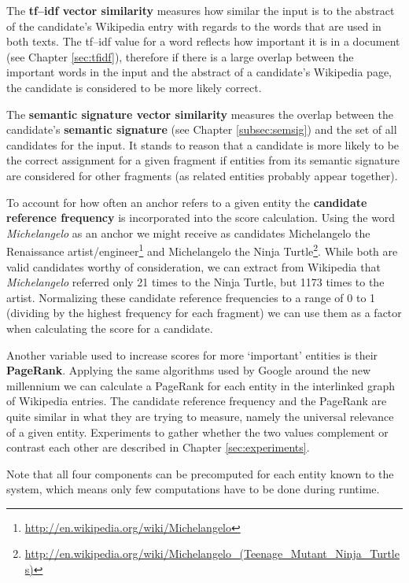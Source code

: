 \documentclass[runningheads,a4paper]{llncs}
\begin{document}
The \textbf{tf--idf vector similarity} measures how similar the input is to the abstract of the candidate's Wikipedia entry with regards to the words that are used in both texts. The tf--idf value for a word reflects how important it is in a document (see Chapter \ref{sec:tfidf}), therefore if there is a large overlap between the important words in the input and the abstract of a candidate's Wikipedia page, the candidate is considered to be more likely correct.

The \textbf{semantic signature vector similarity} measures the overlap between the candidate's \textbf{semantic signature} (see Chapter \ref{subsec:semsig}) and the set of all candidates for the input. It stands to reason that a candidate is more likely to be the correct assignment for a given fragment if entities from its semantic signature are considered for other fragments (as related entities probably appear together).

To account for how often an anchor refers to a given entity the \textbf{candidate reference frequency} is incorporated into the score calculation. Using the word \textit{Michelangelo} as an anchor we might receive as candidates Michelangelo the Renaissance artist/engineer\footnote{\url{http://en.wikipedia.org/wiki/Michelangelo}} and Michelangelo the Ninja Turtle\footnote{\url{http://en.wikipedia.org/wiki/Michelangelo_(Teenage_Mutant_Ninja_Turtles)}}. While both are valid candidates worthy of consideration, we can extract from Wikipedia that \textit{Michelangelo} referred only 21 times to the Ninja Turtle, but 1173 times to the artist. Normalizing these candidate reference frequencies to a range of 0 to 1 (dividing by the highest frequency for each fragment) we can use them as a factor when calculating the score for a candidate.

Another variable used to increase scores for more `important' entities is their \textbf{PageRank}. Applying the same algorithms used by Google around the new millennium we can calculate a PageRank for each entity in the interlinked graph of Wikipedia entries. The candidate reference frequency and the PageRank are quite similar in what they are trying to measure, namely the universal relevance of a given entity. Experiments to gather whether the two values complement or contrast each other are described in Chapter \ref{sec:experiments}.

Note that all four components can be precomputed for each entity known to the system, which means only few computations have to be done during runtime.
\end{document}
